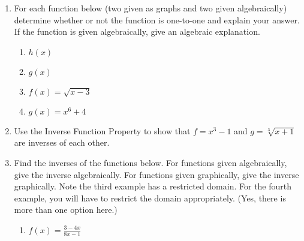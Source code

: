 \documentclass[11pt]{article}
\begin{document}
\begin{enumerate}
\item For each function below (two given as graphs and two given algebraically) determine whether or not the function is one-to-one and explain your answer. If the function is given algebraically, give an algebraic explanation.
\begin{enumerate}
\item $h(x)$ 
\item $g(x)$
\item $f(x)=\sqrt{x-3}$
\vfill
\item $g(x)=x^6+4$
\vfill
\end{enumerate}

\item Use the Inverse Function Property to show that $f=x^3-1$ and $g=\sqrt[3]{x+1}$ are inverses of each other.
\vfill

\newpage

\item Find the inverses of the functions below. For functions given algebraically, give the inverse algebraically. For functions given graphically, give the inverse graphically. Note the third example has a restricted domain. For the fourth example, you will have to restrict the domain appropriately. (Yes, there is more than one option here.)
\begin{enumerate}
\item $f(x)= \frac{3-4x}{8x-1}$


\end{enumerate}
\end{enumerate}
\end{document}
